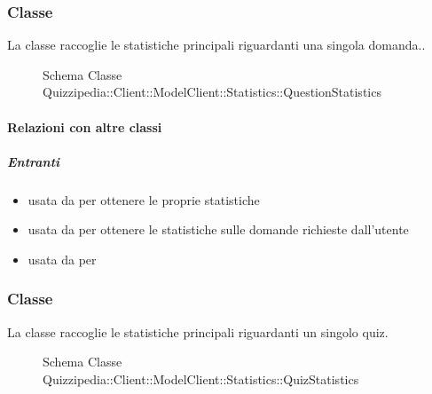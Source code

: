 \subsubsection{Classe }
La classe raccoglie le statistiche principali riguardanti una singola domanda..
\begin{figure}[H]
\centering
\noindent{}
\caption[Schema Classe QuestionStatistics]{Schema Classe Quizzipedia::Client::ModelClient::Statistics::QuestionStatistics}
\end{figure}
\paragraph{Relazioni con altre classi}
\subparagraph{Entranti}
\begin{itemize}
\item usata da  per ottenere le proprie statistiche
\item usata da  per ottenere le statistiche sulle domande richieste dall'utente
\item usata da  per 
\end{itemize}
\subsubsection{Classe }
La classe raccoglie le statistiche principali riguardanti un singolo quiz.
\begin{figure}[H]
\centering
\noindent{}
\caption[Schema Classe QuizStatistics]{Schema Classe Quizzipedia::Client::ModelClient::Statistics::QuizStatistics}
\end{figure}
